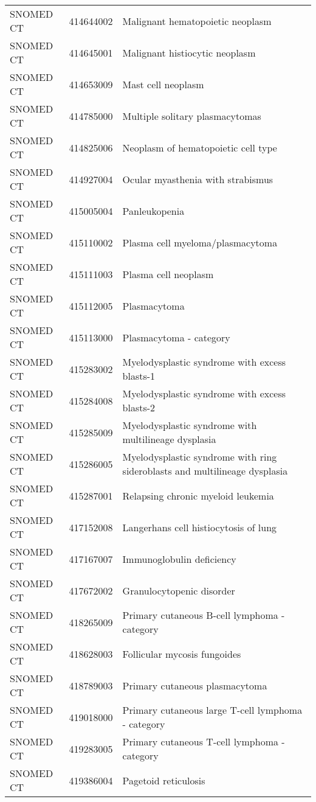 \begin{table}[ht]
\begin{tabular}{lll}
  SNOMED CT & 414644002 & Malignant hematopoietic neoplasm \\ 
  SNOMED CT & 414645001 & Malignant histiocytic neoplasm \\ 
  SNOMED CT & 414653009 & Mast cell neoplasm \\ 
  SNOMED CT & 414785000 & Multiple solitary plasmacytomas \\ 
  SNOMED CT & 414825006 & Neoplasm of hematopoietic cell type \\ 
  SNOMED CT & 414927004 & Ocular myasthenia with strabismus \\ 
  SNOMED CT & 415005004 & Panleukopenia \\ 
  SNOMED CT & 415110002 & Plasma cell myeloma/plasmacytoma \\ 
  SNOMED CT & 415111003 & Plasma cell neoplasm \\ 
  SNOMED CT & 415112005 & Plasmacytoma \\ 
  SNOMED CT & 415113000 & Plasmacytoma - category \\ 
  SNOMED CT & 415283002 & Myelodysplastic syndrome with excess blasts-1 \\ 
  SNOMED CT & 415284008 & Myelodysplastic syndrome with excess blasts-2 \\ 
  SNOMED CT & 415285009 & Myelodysplastic syndrome with multilineage dysplasia \\ 
  SNOMED CT & 415286005 & Myelodysplastic syndrome with ring sideroblasts and multilineage dysplasia \\ 
  SNOMED CT & 415287001 & Relapsing chronic myeloid leukemia \\ 
  SNOMED CT & 417152008 & Langerhans cell histiocytosis of lung \\ 
  SNOMED CT & 417167007 & Immunoglobulin deficiency \\ 
  SNOMED CT & 417672002 & Granulocytopenic disorder \\ 
  SNOMED CT & 418265009 & Primary cutaneous B-cell lymphoma - category \\ 
  SNOMED CT & 418628003 & Follicular mycosis fungoides \\ 
  SNOMED CT & 418789003 & Primary cutaneous plasmacytoma \\ 
  SNOMED CT & 419018000 & Primary cutaneous large T-cell lymphoma - category \\ 
  SNOMED CT & 419283005 & Primary cutaneous T-cell lymphoma - category \\ 
  SNOMED CT & 419386004 & Pagetoid reticulosis \\ 

\end{tabular}
\end{table}
